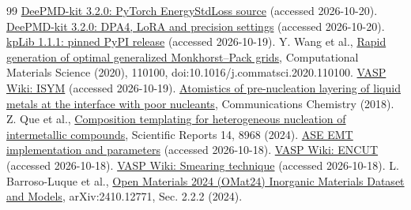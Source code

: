 \documentclass[11pt,a4paper]{article}
\begin{document}
\begin{thebibliography}{99}
\href{https://github.com/deepmodeling/deepmd-kit/blob/v3.2.0/deepmd/pt/loss/ener.py}{DeePMD-kit 3.2.0: PyTorch EnergyStdLoss source} (accessed 2026-10-20).
\href{https://docs.deepmodeling.com/projects/deepmd/en/v3.2.0/model/dpa4.html}{DeePMD-kit 3.2.0: DPA4, LoRA and precision settings} (accessed 2026-10-20).
\href{https://pypi.org/project/kpLib/1.1.1/}{kpLib 1.1.1: pinned PyPI release} (accessed 2026-10-19).
Y. Wang et al., \href{https://arxiv.org/abs/1907.13610}{Rapid generation of optimal generalized Monkhorst--Pack grids}, Computational Materials Science (2020), 110100, doi:10.1016/j.commatsci.2020.110100.
\href{https://vasp.at/wiki/ISYM}{VASP Wiki: ISYM} (accessed 2026-10-19).
\href{https://www.nature.com/articles/s42004-018-0104-1}{Atomistics of pre-nucleation layering of liquid metals at the interface with poor nucleants}, Communications Chemistry (2018).
Z. Que et al., \href{https://www.nature.com/articles/s41598-024-59709-w}{Composition templating for heterogeneous nucleation of intermetallic compounds}, Scientific Reports 14, 8968 (2024).
\href{https://docs.ase-lib.org/_modules/ase/calculators/emt.html}{ASE EMT implementation and parameters} (accessed 2026-10-18).
\href{https://vasp.at/wiki/ENCUT}{VASP Wiki: ENCUT} (accessed 2026-10-18).
\href{https://vasp.at/wiki/index.php/Smearing_technique}{VASP Wiki: Smearing technique} (accessed 2026-10-18).
L. Barroso-Luque et al., \href{https://arxiv.org/html/2410.12771v1}{Open Materials 2024 (OMat24) Inorganic Materials Dataset and Models}, arXiv:2410.12771, Sec. 2.2.2 (2024).
\end{thebibliography}
\end{document}
